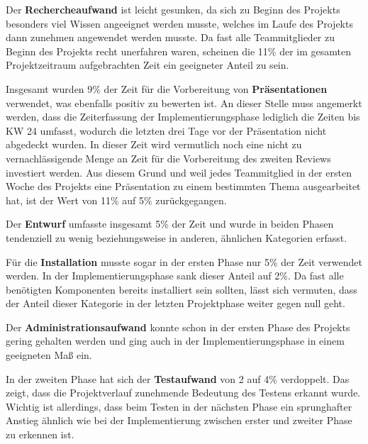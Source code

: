 \documentclass[../review_3.tex]{subfiles}
\begin{document}
Der \textbf{Rechercheaufwand} ist leicht gesunken, da sich zu Beginn des Projekts besonders viel Wissen angeeignet werden musste, welches im Laufe des Projekts dann zunehmen angewendet werden musste. Da fast alle Teammitglieder zu Beginn des Projekts recht unerfahren waren, scheinen die 11\% der im gesamten Projektzeitraum aufgebrachten Zeit ein geeigneter Anteil zu sein.

Insgesamt wurden 9\% der Zeit für die Vorbereitung von \textbf{Präsentationen} verwendet, was ebenfalls positiv zu bewerten ist. An dieser Stelle muss angemerkt werden, dass die Zeiterfassung der Implementierungsphase lediglich die Zeiten bis KW 24 umfasst, wodurch die letzten drei Tage vor der Präsentation nicht abgedeckt wurden. In dieser Zeit wird vermutlich noch eine nicht zu vernachlässigende Menge an Zeit für die Vorbereitung des zweiten Reviews investiert werden. Aus diesem Grund und weil jedes Teammitglied in der ersten Woche des Projekts eine Präsentation zu einem bestimmten Thema ausgearbeitet hat, ist der Wert von 11\% auf 5\% zurückgegangen.

Der \textbf{Entwurf} umfasste insgesamt 5\% der Zeit und wurde in beiden Phasen tendenziell zu wenig beziehungsweise in anderen, ähnlichen Kategorien erfasst.

Für die \textbf{Installation} musste sogar in der ersten Phase nur 5\% der Zeit verwendet werden. In der Implementierungsphase sank dieser Anteil auf 2\%. Da fast alle benötigten Komponenten bereits installiert sein sollten, lässt sich vermuten, dass der Anteil dieser Kategorie in der letzten Projektphase weiter gegen null geht.

Der \textbf{Administrationsaufwand} konnte schon in der ersten Phase des Projekts gering gehalten werden und ging auch in der Implementierungsphase in einem geeigneten Maß ein.

In der zweiten Phase hat sich der \textbf{Testaufwand} von 2 auf 4\% verdoppelt. Das zeigt, dass die Projektverlauf zunehmende Bedeutung des Testens erkannt wurde. Wichtig ist allerdings, dass beim Testen in der nächsten Phase ein sprunghafter Anstieg ähnlich wie bei der Implementierung zwischen erster und zweiter Phase zu erkennen ist.
\end{document}
